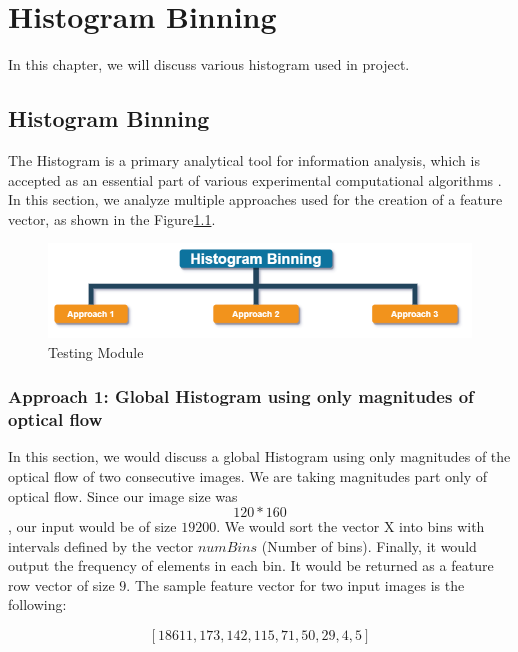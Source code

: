 \chapter{Histogram Binning} %

\label{Chapter 5} 

In this chapter, we will discuss various histogram used in project.


\section{Histogram Binning}
The Histogram is a primary analytical tool for information analysis, which is accepted as an essential part of various experimental computational algorithms \citep{shams2007efficient}. In this section, we analyze multiple approaches used for the creation of a feature vector, as shown in the Figure\ref{fig:Ch05F001}.

 \begin{figure}[H]
  \includegraphics[scale= 0.5]{./Pictures/histogram_binning.png}
  \caption{Testing Module}
  \label{fig:Ch05F001}
\end{figure}




\subsection{Approach 1: Global Histogram using only magnitudes of optical flow}
In this section, we would discuss a global Histogram using only magnitudes of the optical flow of two consecutive images.
We are taking magnitudes part only of optical flow. Since our image size was \[120 \ast 160\], our input would be of size $19200$. We would sort the vector X into bins with intervals defined by the vector $numBins$ (Number of bins). Finally, it would output the frequency of elements in each bin. It would be returned as a feature row vector of size $9$.
The sample feature vector for two input images is the following:

\[[18611 ,173 ,142 ,115 ,71 ,50 ,29 ,4 ,5] \]



